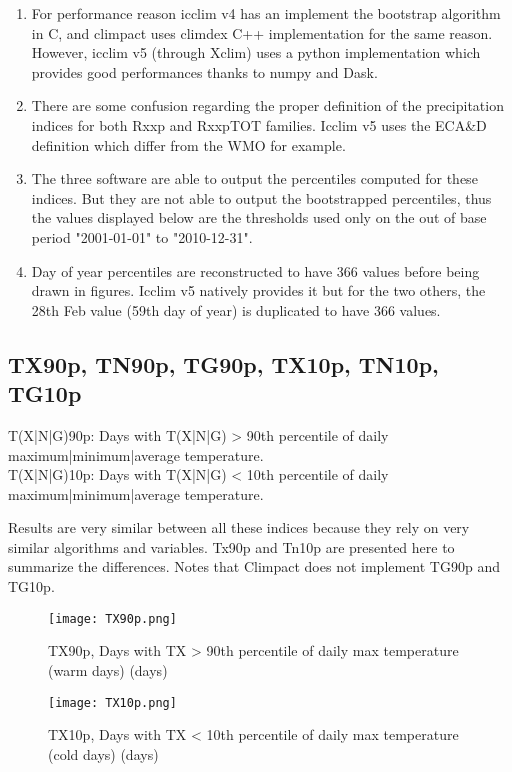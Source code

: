 \documentclass[a4paper,11pt]{article}
\begin{document}
    \begin{enumerate}
        \item For performance reason icclim v4 has an implement the bootstrap algorithm in C, and climpact uses climdex C++ implementation for the same reason. However, icclim v5 (through Xclim) uses a python implementation which provides good performances thanks to numpy and Dask.
        \item There are some confusion regarding the proper definition of the precipitation indices for both Rxxp and RxxpTOT families. Icclim v5 uses the ECA\&D definition which differ from the WMO for example.
        \item The three software are able to output the percentiles computed for these indices. But they are not able to output the bootstrapped percentiles, thus the values displayed below are the thresholds used only on the out of base period "2001-01-01" to "2010-12-31".
        \item Day of year percentiles are reconstructed to have 366 values before being drawn in figures. Icclim v5 natively provides it but for the two others, the 28th Feb value (59th day of year) is duplicated to have 366 values.
    \end{enumerate}


\subsection{TX90p, TN90p, TG90p, TX10p, TN10p, TG10p}
    T(X|N|G)90p: Days with T(X|N|G) > 90th percentile of daily maximum|minimum|average temperature.\\
    T(X|N|G)10p: Days with T(X|N|G) < 10th percentile of daily maximum|minimum|average temperature.

    Results are very similar between all these indices because they rely on very similar algorithms and variables. Tx90p and Tn10p are presented here to summarize the differences.
    Notes that Climpact does not implement TG90p and TG10p.

    \begin{figure}[!hbt]
        \centering
        \texttt{[image: TX90p.png]}
        \caption{TX90p, Days with TX > 90th percentile of daily max temperature (warm
        days) (days)}
        \label{figure/tx90p}
    \end{figure}

    \begin{figure}[!hbt]
        \centering
        \texttt{[image: TX10p.png]}
        \caption{TX10p, Days with TX < 10th percentile of daily max temperature (cold days) (days)}
        \label{figure/tx10p}
    \end{figure}
\end{document}
